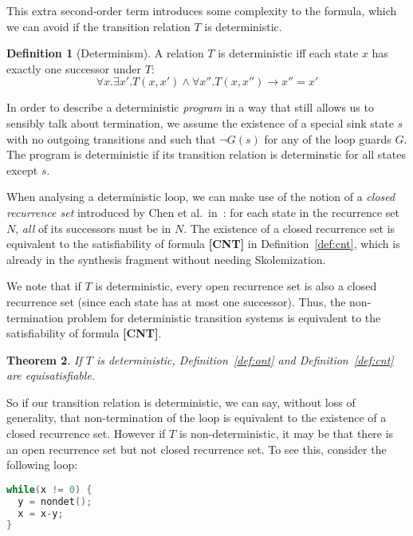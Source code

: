 \documentclass[preprint]{sigplanconf}
\newtheorem{theorem}{Theorem}
\theoremstyle{definition}
\newtheorem{definition}[theorem]{Definition}
\begin{document}
This extra second-order term introduces some complexity to the formula, which
we can avoid if the transition relation $T$ is deterministic.
\begin{definition}[Determinism]
 A relation $T$ is deterministic iff each state $x$ has exactly one successor under $T$:
 $$\forall x . \exists x' . T(x, x') \wedge \forall x'' . T(x, x'') \rightarrow x'' = x'$$
\end{definition}
In order to describe a deterministic \emph{program} in a way that still allows us
to sensibly talk about termination, we assume the existence of a special sink
state $s$ with no outgoing transitions and such that $\lnot G(s)$ for any
of the loop guards $G$.  The program is deterministic if its transition
relation is determinstic for all states except $s$.

When analysing a deterministic loop, we can make use of the notion of a \emph{closed recurrence set}
introduced by Chen et al.~in~\cite{DBLP:conf/tacas/ChenCFNO14}:  for each
state in the recurrence set $N$, \emph{all} of its successors must be in $N$.
The existence of a closed recurrence set is equivalent to the satisfiability
of formula {\bf [CNT]} in Definition~\ref{def:cnt}, which is already in the synthesis
fragment without needing Skolemization.

We note that if $T$ is deterministic, every open recurrence set is also a
closed recurrence set (since each state has at most one successor).  Thus,
the non-termination problem for deterministic transition systems is
equivalent to the satisfiability of formula {\bf [CNT]}.


\begin{theorem}
\label{thm:cnt}
 If $T$ is deterministic,
 Definition~\ref{def:ont} and Definition~\ref{def:cnt} are equisatisfiable.
\end{theorem}

%  


So if our transition relation is deterministic, we can say, without
loss of generality, that non-termination of the loop is equivalent
to the existence of a closed recurrence set.  However if $T$ is
non-deterministic, it may be that there is an open recurrence
set but not closed recurrence set.  To see this, consider the following
loop:
%
\begin{lstlisting}[language=C]
while(x != 0) {
  y = nondet();
  x = x-y;
}
\end{lstlisting}
\end{document}
